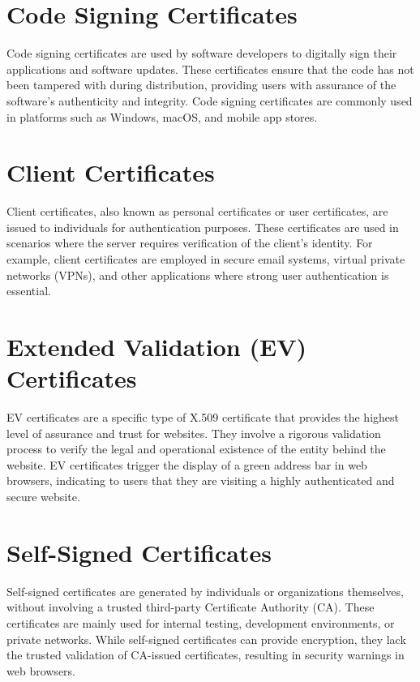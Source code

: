 \documentclass[
12pt,
oneside, 
onehalfspacing, 
nolistspacing, 
parskip, 
chapterinoneline, 
]{AASTCOMPUTER}
\begin{document}
\section{Code Signing Certificates}
Code signing certificates are used by software developers to digitally sign their applications and software updates. These certificates ensure that the code has not been tampered with during distribution, providing users with assurance of the software's authenticity and integrity. Code signing certificates are commonly used in platforms such as Windows, macOS, and mobile app stores.
\section{Client Certificates}
Client certificates, also known as personal certificates or user certificates, are issued to individuals for authentication purposes. These certificates are used in scenarios where the server requires verification of the client's identity. For example, client certificates are employed in secure email systems, virtual private networks (VPNs), and other applications where strong user authentication is essential.
\section{Extended Validation (EV) Certificates}
EV certificates are a specific type of X.509 certificate that provides the highest level of assurance and trust for websites. They involve a rigorous validation process to verify the legal and operational existence of the entity behind the website. EV certificates trigger the display of a green address bar in web browsers, indicating to users that they are visiting a highly authenticated and secure website.
\section{Self-Signed Certificates}
Self-signed certificates are generated by individuals or organizations themselves, without involving a trusted third-party Certificate Authority (CA). These certificates are mainly used for internal testing, development environments, or private networks. While self-signed certificates can provide encryption, they lack the trusted validation of CA-issued certificates, resulting in security warnings in web browsers.
\end{document}
